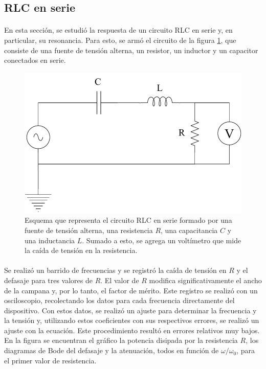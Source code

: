\subsection{RLC en serie}\label{sec:RLC serie}
\paragraph{}En esta sección, se estudió la respuesta de un circuito RLC en serie y, en particular, su resonancia. Para esto, se armó el circuito de la figura \ref{fig:RLC-SERIE}, que consiste de una fuente de tensión alterna, un resistor, un inductor y un capacitor conectados en serie. 


\begin{figure} [H]
    \centering
    \includegraphics[width = 0.6\linewidth]{Esquemas/RLC-SERIE.drawio.pdf}
    \caption{Esquema que representa el circuito RLC en serie formado por una fuente de tensión alterna, una resistencia $R$, una capacitancia $C$ y una inductancia $L$. Sumado a esto, se agrega un voltímetro que mide la caída de tensión en la resistencia.}
    \label{fig:RLC-SERIE}
\end{figure}

\paragraph{}
Se realizó un barrido de frecuencias y se registró la caída de tensión en $R$ y el defasaje para tres valores de $R$. El valor de $R$ modifica significativamente el ancho de la campana y, por lo tanto, el factor de mérito. Este registro se realizó con un osciloscopio, recolectando los datos para cada frecuencia directamente del dispositivo. Con estos datos, se realizó un ajuste para determinar la frecuencia y la tensión y, utilizando estos coeficientes con sus respectivos errores, se realizó un ajuste con la ecuación. Este procedimiento resultó en errores relativos muy bajos. En la figura se encuentran el gráfico la potencia disipada por la resistencia $R$, los diagramas de Bode del defasaje y la atenuación, todos en función de $\omega/\omega_{0}$, para el primer valor de resistencia.


